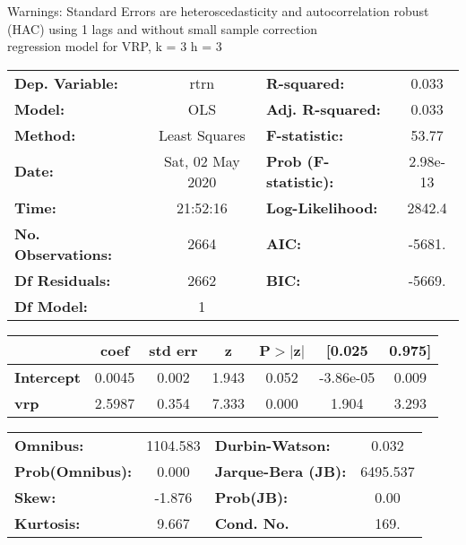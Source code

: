 Warnings: \newline
 [1] Standard Errors are heteroscedasticity and autocorrelation robust (HAC) using 1 lags and without small sample correction\\ 

regression model for VRP, k = 3 h = 3\begin{center}
\begin{tabular}{lclc}
\toprule
\textbf{Dep. Variable:}    &       rtrn       & \textbf{  R-squared:         } &     0.033   \\
\textbf{Model:}            &       OLS        & \textbf{  Adj. R-squared:    } &     0.033   \\
\textbf{Method:}           &  Least Squares   & \textbf{  F-statistic:       } &     53.77   \\
\textbf{Date:}             & Sat, 02 May 2020 & \textbf{  Prob (F-statistic):} &  2.98e-13   \\
\textbf{Time:}             &     21:52:16     & \textbf{  Log-Likelihood:    } &    2842.4   \\
\textbf{No. Observations:} &        2664      & \textbf{  AIC:               } &    -5681.   \\
\textbf{Df Residuals:}     &        2662      & \textbf{  BIC:               } &    -5669.   \\
\textbf{Df Model:}         &           1      & \textbf{                     } &             \\
\bottomrule
\end{tabular}
\begin{tabular}{lcccccc}
                   & \textbf{coef} & \textbf{std err} & \textbf{z} & \textbf{P$> |$z$|$} & \textbf{[0.025} & \textbf{0.975]}  \\
\midrule
\textbf{Intercept} &       0.0045  &        0.002     &     1.943  &         0.052        &    -3.86e-05    &        0.009     \\
\textbf{vrp}       &       2.5987  &        0.354     &     7.333  &         0.000        &        1.904    &        3.293     \\
\bottomrule
\end{tabular}
\begin{tabular}{lclc}
\textbf{Omnibus:}       & 1104.583 & \textbf{  Durbin-Watson:     } &    0.032  \\
\textbf{Prob(Omnibus):} &   0.000  & \textbf{  Jarque-Bera (JB):  } & 6495.537  \\
\textbf{Skew:}          &  -1.876  & \textbf{  Prob(JB):          } &     0.00  \\
\textbf{Kurtosis:}      &   9.667  & \textbf{  Cond. No.          } &     169.  \\
\bottomrule
\end{tabular}
\end{center}

